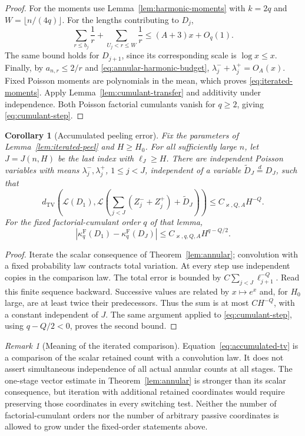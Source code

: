 \documentclass[11pt]{article}
\numberwithin{equation}{section}
\newcommand{\TV}{d_{\mathrm{TV}}}
\newcommand{\cL}{\mathcal L}
\newtheorem{corollary}[theorem]{Corollary}
\theoremstyle{definition}
\theoremstyle{remark}
\newtheorem{remark}[theorem]{Remark}
\begin{document}
\begin{proof}
For the moments use Lemma~\ref{lem:harmonic-moments} with $k=2q$ and
$W=\lfloor n/(4q)\rfloor$.  For the lengths contributing to $D_j$,
\[
 \sum_{r\le b_j}\frac1r+
 \sum_{U_j<r\le W}\frac1r
 \le(A+3)x+O_q(1).
\]
The same bound holds for $D_{j+1}$, since its corresponding scale is
$\log x\le x$.  Finally, by $a_{n,r}\le2/r$ and
\eqref{eq:annular-harmonic-budget},
$\lambda_j^-+\lambda_j^+=O_A(x)$.
Fixed Poisson moments are polynomials in the mean, which proves
\eqref{eq:iterated-moments}.  Apply Lemma~\ref{lem:cumulant-transfer} and
additivity under independence.  Both Poisson factorial cumulants vanish
for $q\ge2$, giving \eqref{eq:cumulant-step}.
\end{proof}


\begin{corollary}[Accumulated peeling error]\label{cor:accumulated}
Fix the parameters of Lemma~\ref{lem:iterated-peel} and $H\ge H_0$.
For all sufficiently large $n$, let $J=J(n,H)$ be the last index with
$\ell_J\ge H$.  There are independent Poisson variables with means
$\lambda_j^-,\lambda_j^+$, $1\le j<J$, independent of a variable
$\widetilde D_J\overset d=D_J$, such that
\begin{equation}\label{eq:accumulated-tv}
 \TV\left(\cL(D_1),
 \cL\left(\sum_{j<J}(Z_j^-+Z_j^+)+\widetilde D_J\right)\right)
 \le C_{\varkappa,Q,A}H^{-Q}.
\end{equation}
For the fixed factorial-cumulant order $q$ of that lemma,
\begin{equation}\label{eq:accumulated-cumulant}
 |\kappa_q^{\mathrm F}(D_1)-\kappa_q^{\mathrm F}(D_J)|
 \le C_{\varkappa,q,Q,A}H^{q-Q/2}.
\end{equation}
\end{corollary}
\begin{proof}
Iterate the scalar consequence of Theorem~\ref{lem:annular}; convolution
with a fixed probability law contracts total variation.  At every step
use independent copies in the comparison law.  The total error is bounded
by $C\sum_{j<J}\ell_{j+1}^{-Q}$.  Read this finite sequence backward.
Successive values are related by $x\mapsto e^x$ and, for $H_0$ large,
are at least twice their predecessors.  Thus the sum is at most
$CH^{-Q}$, with a constant independent of $J$.  The same argument applied
to \eqref{eq:cumulant-step}, using $q-Q/2<0$, proves the second bound.
\end{proof}

\begin{remark}[Meaning of the iterated comparison]
Equation~\eqref{eq:accumulated-tv} is a comparison of the scalar retained
count with a convolution law.  It does not assert simultaneous independence
of all actual annular counts at all stages.  The one-stage vector estimate
in Theorem~\ref{lem:annular} is stronger than its scalar consequence, but
iteration with additional retained coordinates would require preserving
those coordinates in every switching test.  Neither the number of
factorial-cumulant orders nor the number of arbitrary passive coordinates
is allowed to grow under the fixed-order statements above.
\end{remark}
\end{document}
